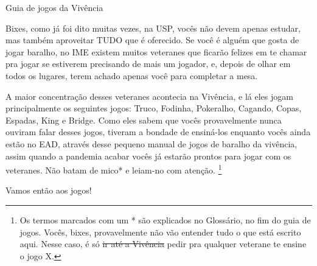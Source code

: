 \begin{secao}{Guia de jogos da Vivência }

Bixes, como já foi dito muitas vezes, na USP, vocês não devem apenas estudar, mas
também aproveitar TUDO que é oferecido. Se você é alguém que gosta de jogar
baralho, no IME existem muitos veteranes que ficarão felizes em te chamar pra
jogar se estiverem precisando de mais um jogador, e, depois de olhar em todos
os lugares, terem achado apenas você para completar a mesa. 

A maior concentração desses veteranes acontecia na Vivência, e lá eles jogam
principalmente os seguintes jogos: Truco, Fodinha, Pokeralho, Cagando, Copas, Espadas,
King e Bridge. Como eles sabem que vocês provavelmente nunca ouviram falar desses jogos,
tiveram a bondade de ensiná-los enquanto vocês ainda estão no EAD, através desse
pequeno manual de jogos de baralho da vivência, assim quando a pandemia acabar vocês já estarão prontos para jogar com os veteranes. Não batam de mico* e
leiam-no com atenção. \footnote{Os termos marcados com um * são explicados no Glossário, no fim do guia de
jogos. Vocês, bixes, provavelmente não vão entender tudo o que está escrito aqui.
Nesse caso, é só \sout{ir até a Vivência} pedir pra qualquer 
veterane te ensine o jogo X.}

Vamos então aos jogos!






\pagebreak

\pagebreak




\end{secao}

